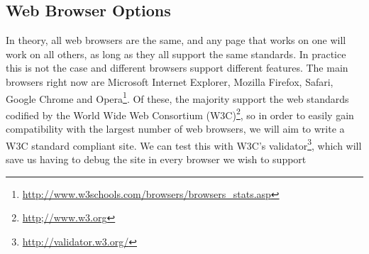 \subsection{Web Browser Options}
In theory, all web browsers are the same, and any page that works on one will work on all others, as long as they all support the same standards. In practice this is not the case and different browsers support different features. The main browsers right now are Microsoft Internet Explorer, Mozilla Firefox, Safari, Google Chrome and Opera\footnote{\url{http://www.w3schools.com/browsers/browsers_stats.asp}}. Of these, the majority support the web standards codified by the World Wide Web Consortium (W3C)\footnote{\url{http;//www.w3.org}}, so in order to easily gain compatibility with the largest number of web browsers, we will aim to write a W3C standard compliant site. We can test this with W3C's validator\footnote{\url{http://validator.w3.org/}}, which will save us having to debug the site in every browser we wish to support





























